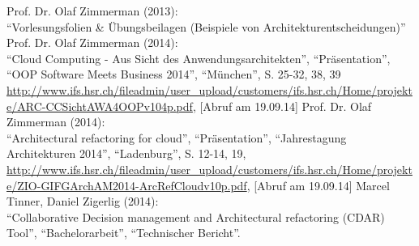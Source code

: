 \begin{thebibliography}{literatur}
	 Prof. Dr. Olaf Zimmerman (2013): \\
		"`Vorlesungsfolien \& Übungsbeilagen (Beispiele von Architekturentscheidungen)"'
	 Prof. Dr. Olaf Zimmerman (2014): \\
		"`Cloud Computing - Aus Sicht des Anwendungsarchitekten"', "`Präsentation"', "`OOP Software Meets Business 2014"', "`München"', S. 25-32, 38, 39
		\url{http://www.ifs.hsr.ch/fileadmin/user\_upload/customers/ifs.hsr.ch/Home/projekte/ARC-CCSichtAWA4OOPv104p.pdf}, 
		[Abruf am 19.09.14]
	 Prof. Dr. Olaf Zimmerman (2014): \\
		"`Architectural refactoring for cloud"', "`Präsentation"', "`Jahrestagung Architekturen 2014"', "`Ladenburg"', S. 12-14, 19,
		\url{http://www.ifs.hsr.ch/fileadmin/user\_upload/customers/ifs.hsr.ch/Home/projekte/ZIO-GIFGArchAM2014-ArcRefCloudv10p.pdf}, 
		[Abruf am 19.09.14]
	 Marcel Tinner, Daniel Zigerlig (2014): \\
		"`Collaborative Decision management and Architectural refactoring (CDAR) Tool"', "`Bachelorarbeit"', "`Technischer Bericht"'.
\end{thebibliography}